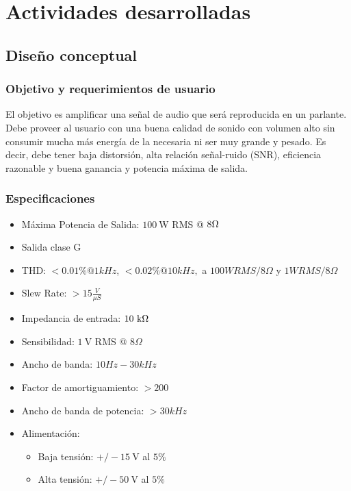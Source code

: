 \documentclass[a4paper,12pt,twoside]{article}
\newcommand{\volt}{\ensuremath{~\mathrm{V}}}
\newcommand{\kohm}{\ensuremath{~\mathrm{k}\ohm}}
\newcommand{\watt}{\ensuremath{~\mathrm{W}}}
\begin{document}


\newpage
\vfill
\tableofcontents
\vfill


\newpage

\section{Actividades desarrolladas}

\subsection{Diseño conceptual}

\subsubsection{Objetivo y requerimientos de usuario}

El objetivo es amplificar una señal de audio que será reproducida en un parlante.  Debe proveer al usuario con una buena calidad de sonido con volumen alto sin consumir mucha más energía de la necesaria ni ser muy grande y pesado. Es decir, debe tener baja distorsión, alta relación señal-ruido (SNR), eficiencia razonable y buena ganancia y potencia máxima de salida.



\subsubsection{Especificaciones}

\bigskip

\begin{itemize}
	\item Máxima Potencia de Salida:  $100\watt$ RMS @ $8\ohm$
	\item Salida clase G
	\item THD: $< 0.01 \% @ 1kHz$, $<0.02 \% @ 10kHz,$ a $100W RMS/8\Omega$ y $1W RMS/8\Omega$
	\item Slew Rate: $>15\frac{V}{\mu S}$
	\item Impedancia de entrada: $10\kohm$
	\item Sensibilidad: $1\volt$ RMS @ $8\Omega$
	\item Ancho de banda: $10 Hz-30kHz$
	\item Factor de amortiguamiento: $>200$
	\item Ancho de banda de potencia: $>30kHz$
	\item Alimentación: 
	\begin{itemize}
		\item Baja tensión: $ +/-15\volt$ al $5\%$
		\item Alta tensión: $ +/-50\volt$ al $5\%$
	\end{itemize}
\end{itemize}
\end{document}
